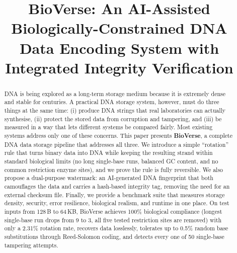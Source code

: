 \documentclass[conference]{IEEEtran}
\begin{document}
\title{BioVerse: An AI-Assisted Biologically-Constrained DNA Data Encoding System with Integrated Integrity Verification}

\author{
\and
{}
\and
{}
}

\maketitle

\begin{abstract}
DNA is being explored as a long-term storage medium because it is extremely dense and stable for centuries. A practical DNA storage system, however, must do three things at the same time: (i) produce DNA strings that real laboratories can actually synthesise, (ii) protect the stored data from corruption and tampering, and (iii) be measured in a way that lets different systems be compared fairly. Most existing systems address only one of these concerns. This paper presents \textbf{BioVerse}, a complete DNA data storage pipeline that addresses all three. We introduce a simple ``rotation'' rule that turns binary data into DNA while keeping the resulting strand within standard biological limits (no long single-base runs, balanced GC content, and no common restriction enzyme sites), and we prove the rule is fully reversible. We also propose a dual-purpose watermark: an AI-generated DNA fingerprint that both camouflages the data and carries a hash-based integrity tag, removing the need for an external checksum file. Finally, we provide a benchmark suite that measures storage density, security, error resilience, biological realism, and runtime in one place. On test inputs from 128\,B to 64\,KB, BioVerse achieves 100\% biological compliance (longest single-base run drops from 9 to 3, all five tested restriction sites are removed) with only a 2.31\% rotation rate, recovers data losslessly, tolerates up to 0.5\% random base substitutions through Reed-Solomon coding, and detects every one of 50 single-base tampering attempts.
\end{abstract}
\end{document}
